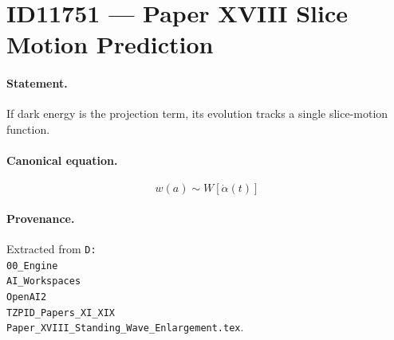 \section*{ID11751 --- Paper XVIII Slice Motion Prediction}

\paragraph{Statement.}
If dark energy is the projection term, its evolution tracks a single slice-motion function.

\paragraph{Canonical equation.}
\[
w(a)\sim W[\dot\alpha(t)]
\]

\paragraph{Provenance.}
Extracted from \texttt{D:\\00\_Engine\\AI\_Workspaces\\OpenAI2\\TZPID\_Papers\_XI\_XIX\\Paper\_XVIII\_Standing\_Wave\_Enlargement.tex}.
